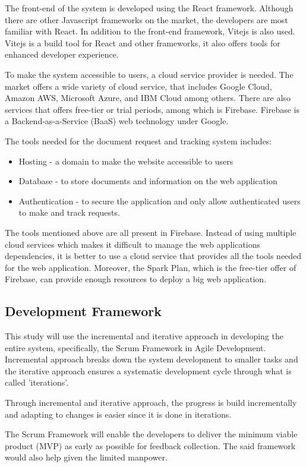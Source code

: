 The front-end of the system is developed using the React framework. Although there are other Javascript frameworks on the market, the developers are most familiar with React. In addition to the front-end framework, Vitejs is also used. Vitejs is a build tool for React and other frameworks, it also offers tools for enhanced developer experience.

To make the system accessible to users, a cloud service provider is needed. The market offers a wide variety of cloud service, that includes Google Cloud, Amazon AWS, Microsoft Azure, and IBM Cloud among others. There are also services that offers free-tier or trial periods, among which is Firebase. Firebase is a Backend-as-a-Service (BaaS) web technology under Google.

The tools needed for the document request and tracking system includes:
\begin{itemize}
   \item Hosting - a domain to make the website accessible to users
   \item Database - to store documents and information on the web application
   \item Authentication - to secure the application and only allow authenticated users to make and track requests.
\end{itemize}

The tools mentioned above are all present in Firebase. Instead of using multiple cloud services which makes it difficult to manage the web applications dependencies, it is better to use a cloud service that provides all the tools needed for the web application. Moreover, the Spark Plan, which is the free-tier offer of Firebase, can provide enough resources to deploy a big web application.

\subsection{Development Framework}
This study will use the incremental and iterative approach in developing the entire system, specifically, the Scrum Framework in Agile Development. Incremental approach breaks down the system development to smaller tasks and the iterative approach ensures a systematic development cycle through what is called 'iterations'.

Through incremental and iterative approach, the progress is build incrementally and adapting to changes is easier since it is done in iterations.

The Scrum Framework will enable the developers to deliver the minimum viable product (MVP) as early as possible for feedback collection. The said framework would also help given the limited manpower.


